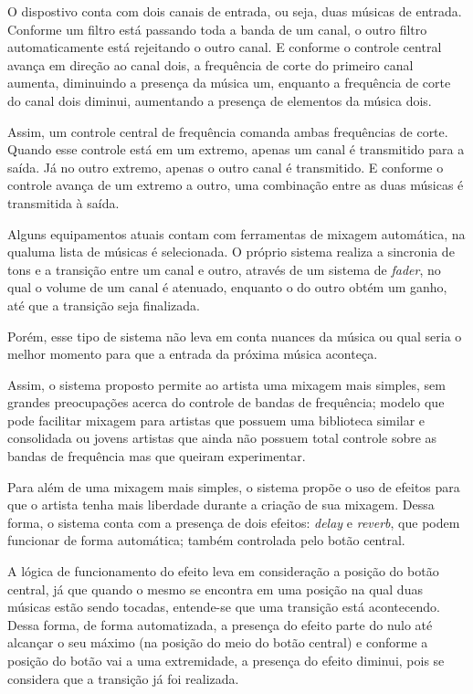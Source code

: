 \par
O dispostivo conta com dois canais de entrada, ou seja, duas músicas de entrada. Conforme um filtro está passando toda a banda de um canal, o outro filtro automaticamente está rejeitando o outro canal. E conforme o controle central avança em direção ao canal dois, a frequência de corte do primeiro canal aumenta, diminuindo a presença da música um, enquanto a frequência de corte do canal dois diminui, aumentando a presença de elementos da música dois. 
\par
Assim, um controle central de frequência comanda ambas frequências de corte. Quando esse controle está em um extremo, apenas um canal é transmitido para a saída. Já no outro extremo, apenas o outro canal é transmitido. E conforme o controle avança de um extremo a outro, uma combinação entre as duas músicas é transmitida à saída.
\par
Alguns equipamentos atuais contam com ferramentas de mixagem automática, na qualuma lista de músicas é selecionada. O próprio sistema realiza a sincronia de tons e a transição entre um canal e outro, através de um sistema de \textit{fader}, no qual o volume de um canal é atenuado, enquanto o do outro obtém um ganho, até que a transição seja finalizada.
\par
Porém, esse tipo de sistema não leva em conta nuances da música ou qual seria o melhor momento para que a entrada da próxima música aconteça.
\par
Assim, o sistema proposto permite ao artista uma mixagem mais simples, sem grandes preocupações acerca do controle de bandas de frequência; modelo que pode facilitar mixagem para artistas que possuem uma biblioteca similar e consolidada ou jovens artistas que ainda não possuem total controle sobre as bandas de frequência mas que queiram experimentar.
\par
Para além de uma mixagem mais simples, o sistema propõe o uso de efeitos para que o artista tenha mais liberdade durante a criação de sua mixagem. Dessa forma, o sistema conta com a presença de dois efeitos: \textit{delay} e \textit{reverb}, que podem funcionar de forma automática; também controlada pelo botão central.
\par
A lógica de funcionamento do efeito leva em consideração a posição do botão central, já que quando o mesmo se encontra em uma posição na qual duas músicas estão sendo tocadas, entende-se que uma transição está acontecendo. Dessa forma, de forma automatizada, a presença do efeito parte do nulo até alcançar o seu máximo (na posição do meio do botão central) e conforme a posição do botão vai a uma extremidade, a presença do efeito diminui, pois se considera que a transição já foi realizada.
